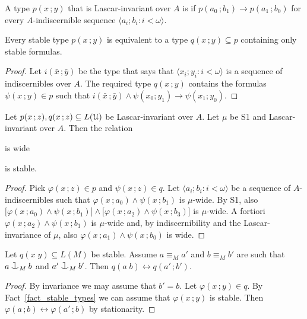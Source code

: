 \documentclass{amsproc}
\renewcommand*{\emph}[1]{%
   \smash{\tikz[baseline]\node[rectangle, fill=teal!25, rounded corners, inner xsep=0.5ex, inner ysep=0.2ex, anchor=base, minimum height = 2.7ex]{\strut #1};}}
\def\cnonfork{\mathbin{\raise1.8ex\rlap{\kern0.6ex\rule{0.6ex}{0.1ex}}\rlap{\kern1.1ex\rule{0.1ex}{1.9ex}}\raise-0.3ex\hbox{$\smile$} } }
\begin{document}
A type $p(x\,;y)$ that is Lascar-invariant over $A$ is \emph{stable\/} if $p(a_0\,;b_1)\rightarrow p(a_1\,;b_0)$ for every $A$-indiscernible sequence $\langle a_i;b_i:i<\omega\rangle$.  

\begin{fact}\label{fact_stable_types}
  Every stable type $p(x\,;y)$ is equivalent to a type $q(x\,;y)\subseteq p$ containing only stable formulas.
\end{fact}

\begin{proof}
  Let $i(\bar x\,;\bar y)$ be the type that says that $\langle x_i;y_i:i<\omega\rangle$ is a sequence of indiscernibles over $A$.
  The required type $q(x\,;y)$ contains the formulas $\psi(x\,;y)\in p$ such that $i(\bar x\,;\bar y)\wedge\psi(x_0;y_1)\rightarrow\psi(x_1;y_0)$.
\end{proof}

\begin{theorem}
  Let $p(x\,;z), q(x\,;z)\subseteq L(\EuScript U)$ be Lascar-invariant over $A$.
  Let $\mu$ be S1 and Lascar-invariant over $A$.
  Then the relation

   is wide

  is stable.
\end{theorem}

\begin{proof}
  Pick $\varphi(x\,;z)\in p$ and $\psi(x\,;z)\in q$.
  Let $\langle a_i;b_i: i<\omega\rangle$ be a sequence of $A$-indi\-scernibles such that $\varphi(x\,;a_0)\wedge \psi(x\,;b_1)$ is $\mu$-wide.
  By S1, also $\big[\varphi(x\,;a_0)\wedge \psi(x\,;b_1)\big]\wedge\big[\varphi(x\,;a_2)\wedge \psi(x\,;b_3)\big]$ is $\mu$-wide.
  A fortiori $\varphi(x\,;a_2)\wedge \psi(x\,;b_1)$ is $\mu$-wide and, by indiscernibility and the Lascar-invariance of $\mu$, also $\varphi(x\,;a_1)\wedge \psi(x\,;b_0)$ is wide.
\end{proof}

\begin{fact}
  Let $q(x\;y)\subseteq L(M)$ be stable.
  Assume $a\equiv_M a' $ and $b\equiv_Mb'$ are such that $a\cnonfork_M b$ and $a'\cnonfork_M b'$.
  Then $q(a\;b)\leftrightarrow q(a'\,;b')$.
\end{fact}

\begin{proof}
  By invariance we may assume that $b'=b$.
  Let $\varphi(x\,;y)\in q$.
  By Fact~\ref{fact_stable_types} we can assume that $\varphi(x\,;y)$ is stable.
  Then $\varphi(a\,;b)\leftrightarrow\varphi(a'\,;b)$ by stationarity.
\end{proof}
\end{document}
